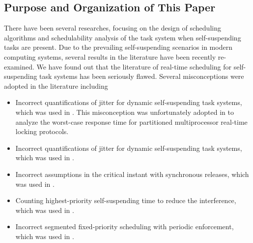 \subsection{Purpose and Organization of This Paper}

There have been several researches, focusing on the design of scheduling algorithms and schedulability analysis of the task system when self-suspending tasks are present. Due to the prevailing self-suspending scenarios in modern computing systems, several results in the literature have been recently re-examined. We have found out that the literature of real-time scheduling for self-suspending task systems has been seriously flawed. Several misconceptions were adopted in the literature including 
\begin{itemize}
\item Incorrect quantifications of jitter for dynamic self-suspending
  task systems, which was used in
  \cite{ECRTS-AudsleyB04,RTAS-AudsleyB04,RTCSA-KimCPKH95}.  This
  misconception was unfortunately adopted in \cite{zeng-2011,bbb-2013,yang-2013,kim-2014,han-2014,carminati-2014,yang-2014,lakshmanan-2009} to analyze the worst-case response time for
  partitioned multiprocessor real-time locking protocols.
\item Incorrect quantifications of jitter for dynamic self-suspending
  task systems, which was used in  \cite{RTCSA-BletsasA05}.
\item Incorrect assumptions in the critical instant with
  synchronous releases, which was used in \cite{LR:rtas10}.
\item Counting highest-priority self-suspending time to reduce the
  interference, which was used in  \cite{RTSS-KimANR13}. 
\item Incorrect segmented fixed-priority scheduling with periodic
  enforcement, which was used in \cite{RTSS-KimANR13,DBLP:journals/ieicet/DingTT09}.
\end{itemize}


